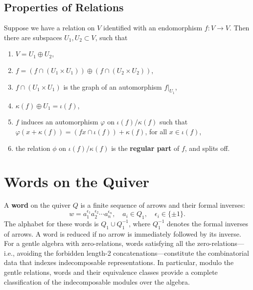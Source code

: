 \documentclass[11pt,oneside]{amsbook}
\numberwithin{equation}{section}
\theoremstyle{plain}
\theoremstyle{definition}
\theoremstyle{remark}
\begin{document}
	\newpage
	\subsection{Properties of Relations}
	
	Suppose we have a relation on $V$ identified with an endomorphism $f:V \to V$. Then there are subspaces $U_1, U_2 \subset V$, such that 
	\begin{enumerate}
		\item $V = U_1 \oplus U_2$, 
		\item $f = \left(f \cap (U_1 \times U_1)\right) \oplus \left(f \cap (U_2 \times U_2)\right)$, 
		\item $f \cap (U_1 \times U_1)$ is the graph of an automorphism $f|_{U_1}$, 
		\item $\kappa(f) \oplus U_1 = \iota(f)$, 
		\item $f$ induces an automorphism $\varphi$ on $\iota(f)/\kappa(f)$ such that $\varphi(x + \kappa(f)) = (fx \cap \iota(f)) + \kappa(f)$, for all $x \in \iota(f)$,
		\item the relation $\phi$ on $\iota(f)/\kappa(f)$ is the \textbf{regular part} of $f$, and splits off. 
	\end{enumerate}
	
	\newpage
	\section{Words on the Quiver}
	A \textbf{word} on the quiver $Q$ is a finite sequence of arrows and their formal inverses:
	\[
	w = a_1^{\epsilon_1} a_2^{\epsilon_2} \cdots a_n^{\epsilon_n}, \quad a_i \in Q_1, \quad \epsilon_i \in \{\pm 1\}.
	\]
	The alphabet for these words is $Q_1 \cup Q_1^{-1}$, where $Q_1^{-1}$ denotes the formal inverses of arrows. A word is reduced if no arrow is immediately followed by its inverse. For a gentle algebra with zero-relations, words satisfying all the zero-relations—i.e., avoiding the forbidden length-2 concatenations—constitute the combinatorial data that indexes indecomposable representations. In particular, modulo the gentle relations, words and their equivalence classes provide a complete classification of the indecomposable modules over the algebra.
\end{document}
